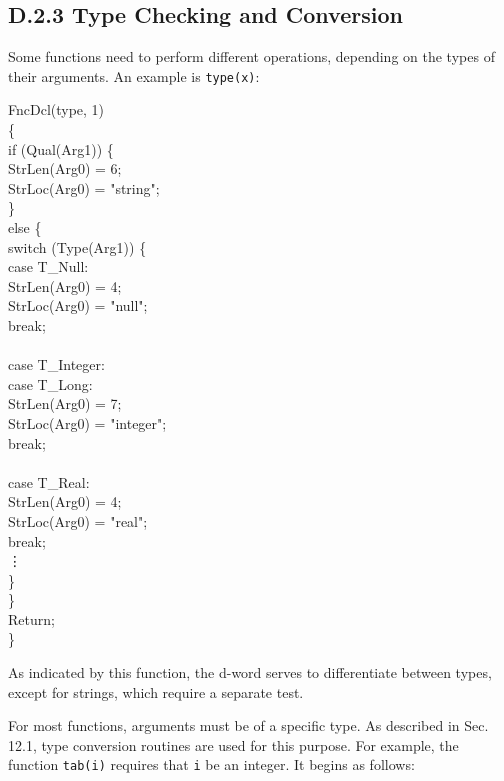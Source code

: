 \subsection[D.2.3 Type Checking and Conversion]{D.2.3 Type Checking and Conversion}

Some functions need to perform different operations, depending on the
types of their arguments. An example is \texttt{type(x)}:

\goodbreak
\begin{iconcode}
\color{red}FncDcl(type, 1)\\
\{\\
\>if (Qual(Arg1)) \{\\
\>\>StrLen(Arg0) = 6;\\
\>\>StrLoc(Arg0) = "string";\\
\>\}\\
\>else \{\\
\>\>switch (Type(Arg1)) \{\\
\>\>\>case T\_Null:\\
\>\>\>\>StrLen(Arg0) = 4;\\
\>\>\>\>StrLoc(Arg0) = "null";\\
\>\>\>\>break;\\
\\
\>\>\>case T\_Integer:\\
\>\>\>case T\_Long:\\
\>\>\>\>StrLen(Arg0) = 7;\\
\>\>\>\>StrLoc(Arg0) = "integer";\\
\>\>\>\>break;\\
\\
\>\>\>case T\_Real:\\
\>\>\>\>StrLen(Arg0) = 4;\\
\>\>\>\>StrLoc(Arg0) = "real";\\
\>\>\>\>break;\\
\>\>\>\>\vdots\\
\>\>\>\}\\
\>\>\}\\
\>\>Return;\\
\>\}
\end{iconcode}

\noindent
As indicated by this function, the d-word serves to differentiate
between types, except for strings, which require a separate test.

For most functions, arguments must be of a specific type. As described in
Sec. 12.1, type conversion routines are used for this purpose. For example,
the function \texttt{tab(i)} requires that \texttt{i} be an integer. It
begins as follows:

